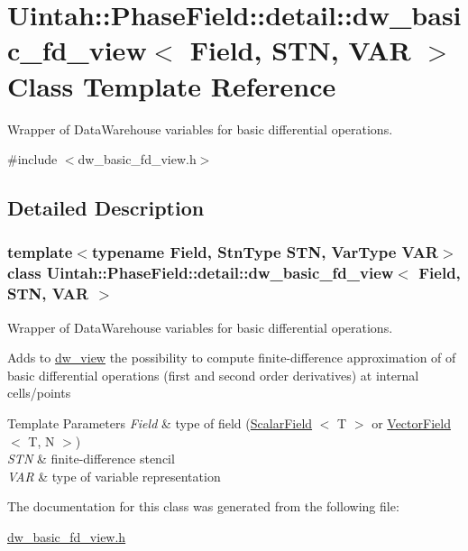 \hypertarget{classUintah_1_1PhaseField_1_1detail_1_1dw__basic__fd__view}{}\section{Uintah\+:\+:Phase\+Field\+:\+:detail\+:\+:dw\+\_\+basic\+\_\+fd\+\_\+view$<$ Field, S\+TN, V\+AR $>$ Class Template Reference}
\label{classUintah_1_1PhaseField_1_1detail_1_1dw__basic__fd__view}


Wrapper of Data\+Warehouse variables for basic differential operations.  




{\ttfamily \#include $<$dw\+\_\+basic\+\_\+fd\+\_\+view.\+h$>$}



\subsection{Detailed Description}
\subsubsection*{template$<$typename Field, Stn\+Type S\+TN, Var\+Type V\+AR$>$\newline
class Uintah\+::\+Phase\+Field\+::detail\+::dw\+\_\+basic\+\_\+fd\+\_\+view$<$ Field, S\+T\+N, V\+A\+R $>$}

Wrapper of Data\+Warehouse variables for basic differential operations. 

Adds to \hyperlink{classUintah_1_1PhaseField_1_1detail_1_1dw__view}{dw\+\_\+view} the possibility to compute finite-\/difference approximation of of basic differential operations (first and second order derivatives) at internal cells/points


\begin{DoxyTemplParams}{Template Parameters}
{\em Field} & type of field (\hyperlink{structUintah_1_1PhaseField_1_1ScalarField}{Scalar\+Field} $<$ T $>$ or \hyperlink{structUintah_1_1PhaseField_1_1VectorField}{Vector\+Field} $<$ T, N $>$) \\
\hline
{\em S\+TN} & finite-\/difference stencil \\
\hline
{\em V\+AR} & type of variable representation \\
\hline
\end{DoxyTemplParams}


The documentation for this class was generated from the following file\+:\begin{DoxyCompactItemize}
\item 
\hyperlink{dw__basic__fd__view_8h}{dw\+\_\+basic\+\_\+fd\+\_\+view.\+h}\end{DoxyCompactItemize}
